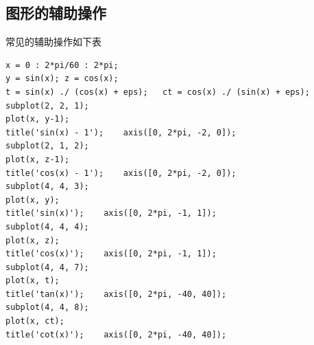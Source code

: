 \subsection{图形的辅助操作}
常见的辅助操作如下表
\begin{table}[!htb]
	\centering
\end{table}
\vspace*{-0.5em}

\examples\label{EX42}
\begin{lstlisting}
x = 0 : 2*pi/60 : 2*pi;
y = sin(x);	z = cos(x);
t = sin(x) ./ (cos(x) + eps);	ct = cos(x) ./ (sin(x) + eps);
subplot(2, 2, 1);
plot(x, y-1);
title('sin(x) - 1');	axis([0, 2*pi, -2, 0]);
subplot(2, 1, 2);
plot(x, z-1);
title('cos(x) - 1');	axis([0, 2*pi, -2, 0]);
subplot(4, 4, 3);
plot(x, y);
title('sin(x)');	axis([0, 2*pi, -1, 1]);
subplot(4, 4, 4);
plot(x, z);
title('cos(x)');	axis([0, 2*pi, -1, 1]);
subplot(4, 4, 7);
plot(x, t);
title('tan(x)');	axis([0, 2*pi, -40, 40]);
subplot(4, 4, 8);
plot(x, ct);
title('cot(x)');	axis([0, 2*pi, -40, 40]);
\end{lstlisting}

